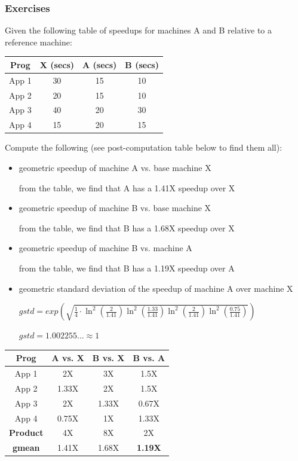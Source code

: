 \documentclass[12pt]{extarticle}
\begin{document}
	\subsubsection{Exercises}

	Given the following table of speedups for machines A and B relative to a reference machine:

	\begin{tabular}[h!]{|c|c|c|c|} \hline
		Prog	& X (secs)	& A (secs)	& B	(secs)	\\ \hline
		App 1	& 30		& 15		& 10		\\ \hline
		App 2	& 20		& 15		& 10		\\ \hline
		App 3	& 40		& 20		& 30		\\ \hline
		App 4	& 15		& 20		& 15		\\ \hline
	\end{tabular}

	Compute the following (see post-computation table below to find them all):

	\begin{itemize}
		\item geometric speedup of machine A vs. base machine X
		
		from the table, we find that A has a 1.41X speedup over X

		\item geometric speedup of machine B vs. base machine X
		
		from the table, we find that B has a 1.68X speedup over X

		\item geometric speedup of machine B vs. machine A
		
		from the table, we find that B has a 1.19X speedup over A

		\item geometric standard deviation of the speedup of machine A over machine X
		
		$gstd = exp(\sqrt{\frac{1}{4} \cdot \ln^2(\frac{2}{1.41}) \ln^2(\frac{1.33}{1.41}) \ln^2(\frac{2}{1.41}) \ln^2(\frac{0.75}{1.41})})$

		$gstd = 1.002255... \approx 1$

	\end{itemize}

	\begin{tabular}[h!]{|c|c|c|c|} \hline
		Prog		& A vs. X	& B vs. X	& B vs. A	\\ \hline
		App 1		& 2X		& 3X		& 1.5X		\\ \hline
		App 2		& 1.33X		& 2X		& 1.5X		\\ \hline
		App 3		& 2X		& 1.33X		& 0.67X		\\ \hline
		App 4		& 0.75X		& 1X		& 1.33X		\\ \hline
		\bf{Product}& 4X		& 8X		& 2X		\\ \hline
		\bf{gmean}	& 1.41X		& 1.68X		& \bf{1.19X}\\ \hline
	\end{tabular}
\end{document}
